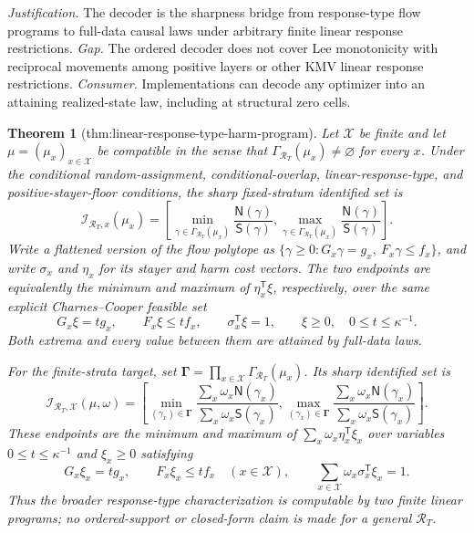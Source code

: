 \documentclass{article}
\newtheorem{theorem}{Theorem}
\begin{document}
\par\smallskip\noindent \textit{Justification.} The decoder is the sharpness bridge from response-type flow programs to full-data causal laws under arbitrary finite linear response restrictions. \textit{Gap.} The ordered decoder does not cover Lee monotonicity with reciprocal movements among positive layers or other KMV linear response restrictions. \textit{Consumer.} Implementations can decode any optimizer into an attaining realized-state law, including at structural zero cells.

\begin{theorem}[thm:linear-response-type-harm-program]\label{thm:linear-response-type-harm-program}
Let \(\mathcal X\) be finite and let \(\mu=(\mu_x)_{x\in\mathcal X}\) be compatible in the sense that \(\Gamma_{\mathcal R_T}(\mu_x)\ne\varnothing\) for every \(x\).  Under the conditional random-assignment, conditional-overlap, linear-response-type, and positive-stayer-floor conditions, the sharp fixed-stratum identified set is
\[\mathcal I_{\mathcal R_T,x}(\mu_x)=\left[
\min_{\gamma\in\Gamma_{\mathcal R_T}(\mu_x)}\frac{\mathsf N(\gamma)}{\mathsf S(\gamma)},
\max_{\gamma\in\Gamma_{\mathcal R_T}(\mu_x)}\frac{\mathsf N(\gamma)}{\mathsf S(\gamma)}
\right].\]
Write a flattened version of the flow polytope as \(\{\gamma\ge0:G_x\gamma=g_x,\ F_x\gamma\le f_x\}\), and write \(\sigma_x\) and \(\eta_x\) for its stayer and harm cost vectors.  The two endpoints are equivalently the minimum and maximum of \(\eta_x^{\mathsf T}\xi\), respectively, over the same explicit Charnes--Cooper feasible set
\[G_x\xi=tg_x,\qquad F_x\xi\le tf_x,\qquad \sigma_x^{\mathsf T}\xi=1,\qquad \xi\ge0,\quad 0\le t\le\kappa^{-1}.\]
Both extrema and every value between them are attained by full-data laws.

For the finite-strata target, set \(\boldsymbol\Gamma=\prod_{x\in\mathcal X}\Gamma_{\mathcal R_T}(\mu_x)\).  Its sharp identified set is
\[\mathcal I_{\mathcal R_T,\mathcal X}(\mu,\omega)=\left[
\min_{(\gamma_x)\in\boldsymbol\Gamma}\frac{\sum_x\omega_x\mathsf N(\gamma_x)}{\sum_x\omega_x\mathsf S(\gamma_x)},
\max_{(\gamma_x)\in\boldsymbol\Gamma}\frac{\sum_x\omega_x\mathsf N(\gamma_x)}{\sum_x\omega_x\mathsf S(\gamma_x)}
\right].\]
These endpoints are the minimum and maximum of \(\sum_x\omega_x\eta_x^{\mathsf T}\xi_x\) over variables \(0\le t\le\kappa^{-1}\) and \(\xi_x\ge0\) satisfying
\[G_x\xi_x=tg_x,\qquad F_x\xi_x\le tf_x\quad(x\in\mathcal X),\qquad
  \sum_{x\in\mathcal X}\omega_x\sigma_x^{\mathsf T}\xi_x=1.\]
Thus the broader response-type characterization is computable by two finite linear programs; no ordered-support or closed-form claim is made for a general \(\mathcal R_T\).
\end{theorem}
\end{document}

